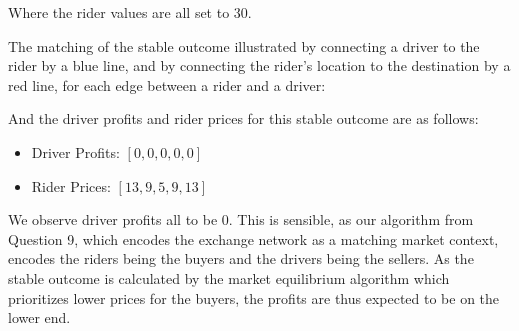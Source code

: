\documentclass{article}
\begin{document}
\begin{enumerate}[label=(\alph*)]
\begin{figure}[H]
{
        }
    \end{figure}

    Where the rider values are all set to 30.


    The matching of the stable outcome illustrated by connecting a driver to the rider by a blue line, and by connecting the rider's location to the destination by a red line, for each edge between a rider and a driver:

    \begin{figure}[H]
        \centering
        
    \end{figure}

    And the driver profits and rider prices for this stable outcome are as follows:

    \begin{itemize}
        \item Driver Profits: $[0, 0, 0, 0, 0]$
        \item Rider Prices: $[13, 9, 5, 9, 13]$
    \end{itemize}
    
    We observe driver profits all to be 0. This is sensible, as our algorithm from Question 9, which encodes the exchange network as a matching market context, encodes the riders being the buyers and the drivers being the sellers. As the stable outcome is calculated by the market equilibrium algorithm which prioritizes lower prices for the buyers, the profits are thus expected to be on the lower end.


\end{enumerate}
\end{document}

